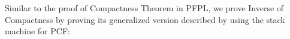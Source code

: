 \documentclass{article}
\newcommand{\RNum}[1]{\uppercase\expandafter{\romannumeral #1\relax}}
\begin{document}





Similar to the proof of Compactness Theorem in PFPL,
we prove Inverse of Compactness by proving
its generalized version described by using the stack machine for PCF:
\end{document}
